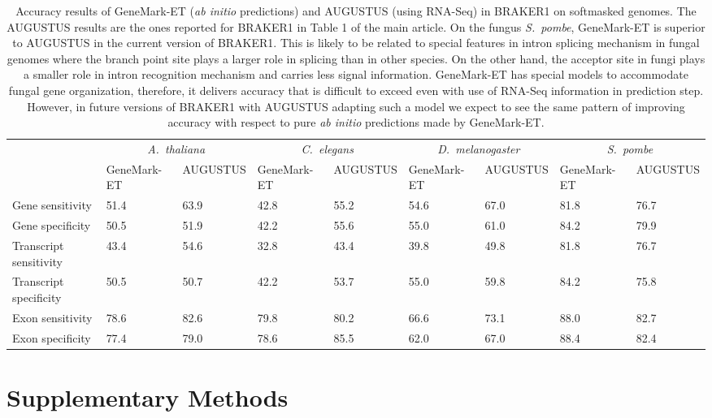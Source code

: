 \documentclass[a4paper,10pt]{report}
\begin{document}
\begin{sidewaystable}
\caption{Accuracy results of GeneMark-ET (\textit{ab initio} predictions) and AUGUSTUS (using RNA-Seq) in BRAKER1 on softmasked genomes.
The AUGUSTUS results are the ones reported for BRAKER1 in Table 1 of the main article. On the fungus \textit{S.~pombe}, GeneMark-ET is superior to AUGUSTUS in the current version of BRAKER1. This is likely to be related to special features in intron splicing mechanism in fungal genomes where the branch point site plays a larger role in splicing than in other species. On the other hand, the acceptor site in fungi plays a smaller role in intron recognition mechanism and carries less signal information. GeneMark-ET has special models to accommodate fungal gene organization, therefore, it delivers accuracy that is difficult to exceed even with use of RNA-Seq information in prediction step. However, in future versions of BRAKER1 with AUGUSTUS adapting such a model we expect to see the same pattern of improving accuracy with respect to pure \textit{ab initio} predictions made by GeneMark-ET. \label{compare}}
\begin{tabular}{lp{1.5cm}p{1.2cm}p{1.5cm}p{1.2cm}p{1.5cm}p{1.2cm}p{1.5cm}p{1.2cm}}\hline
 & \multicolumn{2}{c}{\textit{A.~thaliana}} &  \multicolumn{2}{c}{\textit{C.~elegans}} &  \multicolumn{2}{c}{\textit{D.~melanogaster}} &  \multicolumn{2}{c}{\textit{S.~pombe}}\\
 & \tiny{GeneMark-ET} & \tiny{AUGUSTUS} & \tiny{GeneMark-ET} & \tiny{AUGUSTUS} &  \tiny{GeneMark-ET} & \tiny{AUGUSTUS} & \tiny{GeneMark-ET} &\tiny{AUGUSTUS}\\
 \hline
Gene sensitivity        & 51.4 & 63.9 & 42.8 & 55.2 & 54.6 & 67.0 & 81.8 & 76.7\\
Gene specificity        & 50.5 & 51.9 & 42.2 & 55.6 & 55.0 & 61.0 & 84.2 & 79.9\\
Transcript sensitivity  & 43.4 & 54.6 & 32.8 & 43.4 & 39.8 & 49.8 & 81.8 & 76.7\\
Transcript specificity  & 50.5 & 50.7 & 42.2 & 53.7 & 55.0 & 59.8 & 84.2 & 75.8\\
Exon sensitivity        & 78.6 & 82.6 & 79.8 & 80.2 & 66.6 & 73.1 & 88.0 & 82.7\\
Exon specificity        & 77.4 & 79.0 & 78.6 & 85.5 & 62.0 & 67.0 & 88.4 & 82.4\\
\hline
\end{tabular}
\end{sidewaystable}

\chapter{Supplementary Methods}
\end{document}
